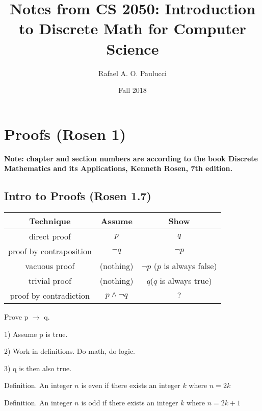 \documentclass[english,openany]{book}
\begin{document}
    \title{Notes from CS 2050: Introduction to Discrete Math for Computer Science}
    \author{Rafael A. O. Paulucci}
    \date{Fall 2018}

    \maketitle

    \tableofcontents


    \chapter{Proofs (Rosen 1)}

    \textbf{Note: chapter and section numbers are according to the book Discrete Mathematics and its Applications, Kenneth Rosen, 7th edition.}

    \section{Intro to Proofs (Rosen 1.7)}

	\begin{tabular}{c|c|c}
		Technique&Assume&Show\\
		\hline
		direct proof&$p$&$q$\\
		proof by contraposition&$\neg q$&$\neg p$\\
		vacuous proof&(nothing)&$\neg p$ ($p$ is always false)\\
		trivial proof&(nothing)&$q$($q$ is always true)\\
		proof by contradiction&$p \wedge \neg q$&$?$\\
	\end{tabular} \newline

	Prove p $\rightarrow$ q.

	1) Assume p is true.

	2) Work in definitions. Do math, do logic.

	3) q is then also true.\newline

	Definition. An integer $n$ is even if there exists an integer $k$ where $n = 2k$\newline

	Definition. An integer $n$ is odd if there exists an integer $k$ where $n = 2k + 1$\newline
\end{document}
